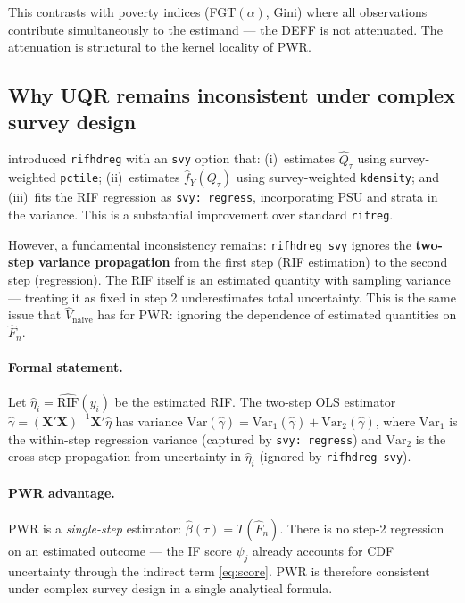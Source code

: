 \documentclass[12pt,a4paper]{article}
\theoremstyle{definition}
\newcommand{\Var}{\mathrm{Var}}
\newcommand{\bX}{\mathbf{X}}
\newcommand{\hbeta}{\hat{\beta}}
\newcommand{\hF}{\hat{F}}
\begin{document}
This contrasts with poverty indices (FGT$(\alpha)$, Gini) where all
observations contribute simultaneously to the estimand --- the DEFF is
not attenuated. The attenuation is structural to the kernel locality
of PWR.

\subsection{Why UQR remains inconsistent under complex survey design}
\label{sec:svy:uqr}

\citet{RiosAvila2020} introduced \texttt{rifhdreg} with an \texttt{svy}
option that: (i)~estimates $\hat{Q}_\tau$ using survey-weighted
\texttt{pctile}; (ii)~estimates $\hat{f}_Y(Q_\tau)$ using survey-weighted
\texttt{kdensity}; and (iii)~fits the RIF regression as
\texttt{svy: regress}, incorporating PSU and strata in the variance.
This is a substantial improvement over standard \texttt{rifreg}.

However, a fundamental inconsistency remains: \texttt{rifhdreg svy}
ignores the \textbf{two-step variance propagation} from the first step
(RIF estimation) to the second step (regression). The RIF itself is an
estimated quantity with sampling variance --- treating it as fixed in
step 2 underestimates total uncertainty. This is the same issue that
$\hat{V}_{\mathrm{naive}}$ has for PWR: ignoring the dependence of
estimated quantities on $\hF_n$.

\paragraph{Formal statement.}
Let $\hat\eta_i = \widehat{\mathrm{RIF}}(y_i)$ be the estimated RIF.
The two-step OLS estimator $\hat\gamma = (\bX'\bX)^{-1}\bX'\hat\eta$
has variance $\Var(\hat\gamma) = \Var_1(\hat\gamma) +
\Var_2(\hat\gamma)$, where $\Var_1$ is the within-step regression
variance (captured by \texttt{svy: regress}) and $\Var_2$ is the
cross-step propagation from uncertainty in $\hat\eta_i$ (ignored by
\texttt{rifhdreg svy}).

\paragraph{PWR advantage.}
PWR is a \textit{single-step} estimator: $\hbeta(\tau) = T(\hF_n)$.
There is no step-2 regression on an estimated outcome --- the
IF score $\psi_j$ already accounts for CDF uncertainty through the
indirect term \eqref{eq:score}. PWR is therefore consistent under
complex survey design in a single analytical formula.
\end{document}
